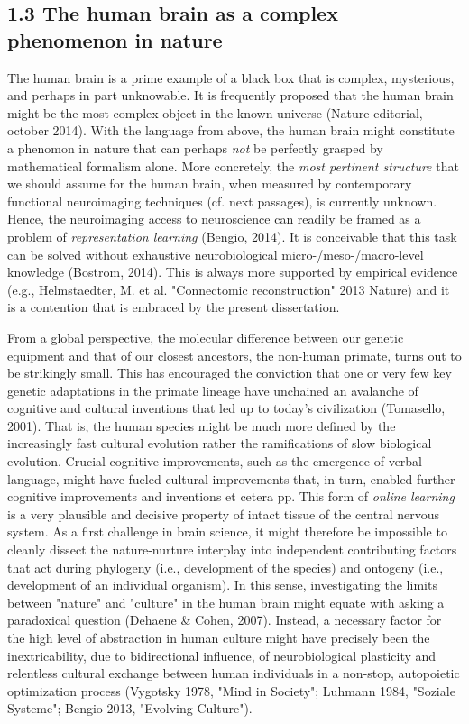 \documentclass[authoryear,review,3p]{elsarticle}
\begin{document}
\subsection*{1.3 The human brain as a complex phenomenon in nature}
The human brain is a prime example of
a black box that is complex, mysterious, and perhaps in part unknowable.
It is frequently proposed that
the human brain might be the most complex object in the known universe
(Nature editorial, october 2014).
With the language from above,
the human brain might constitute a phenomon in nature that
can perhaps \textit{not} be perfectly grasped by mathematical formalism alone.
More concretely,
the \textit{most pertinent structure}
that we should assume for the human brain,
when measured by
contemporary functional neuroimaging techniques (cf. next passages),
is currently unknown.
Hence, the neuroimaging access to neuroscience can readily be framed as
a problem of \textit{representation learning} (Bengio, 2014).
It is conceivable
that this task can be solved without exhaustive
neurobiological micro-/meso-/macro-level knowledge (Bostrom, 2014).
This is always more supported by empirical evidence
(e.g., Helmstaedter, M. et al. "Connectomic reconstruction" 2013 Nature)
and
it is a contention that is embraced by the present dissertation.


From a global perspective,
the molecular difference between our genetic equipment and that
of our closest ancestors, the non-human primate, turns out to be 
strikingly small.
This has encouraged the conviction that one or very few key genetic
adaptations in the primate lineage have unchained an avalanche
of cognitive and cultural inventions that led up to today's civilization
(Tomasello, 2001).
That is, the human species might be much more defined by the
increasingly fast cultural evolution rather the ramifications
of slow biological evolution.
Crucial cognitive improvements,
such as the emergence of verbal language, 
might have fueled cultural improvements that, in turn, enabled
further cognitive improvements and inventions et cetera pp.
This form of \textit{online learning} is a very plausible and decisive
property of intact tissue of the central nervous system.
%
As a first challenge in brain science,
it might therefore be impossible to cleanly dissect
the nature-nurture interplay into independent contributing factors that act
during
phylogeny (i.e., development of the species)
and
ontogeny (i.e., development of an individual organism).
%
In this sense,
investigating the limits between "nature" and "culture" in the human brain
might equate with asking a paradoxical question
(Dehaene \& Cohen, 2007).
%
Instead,
a necessary factor for the high level of abstraction in human culture
might have precisely been the inextricability, due to bidirectional influence, of
neurobiological plasticity and relentless cultural exchange
between human individuals
in a non-stop, autopoietic optimization process
(Vygotsky 1978, "Mind in Society"; Luhmann 1984, "Soziale Systeme";
Bengio 2013, "Evolving Culture").
\end{document}
